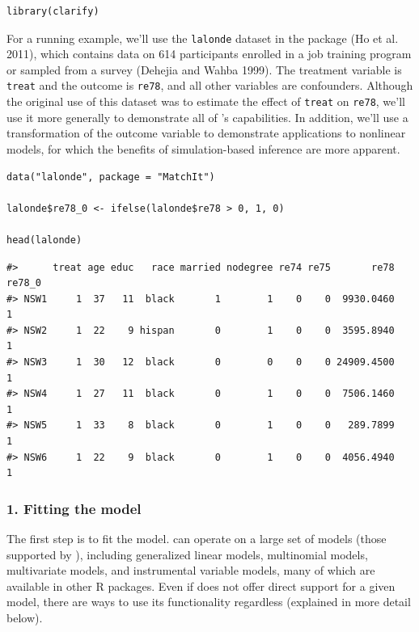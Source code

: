 \begin{verbatim}
library(clarify)
\end{verbatim}

For a running example, we'll use the \texttt{lalonde} dataset in the  package (Ho et al. 2011), which contains data on 614 participants enrolled in a job training program or sampled from a survey (Dehejia and Wahba 1999). The treatment variable is \texttt{treat} and the outcome is \texttt{re78}, and all other variables are confounders. Although the original use of this dataset was to estimate the effect of \texttt{treat} on \texttt{re78}, we'll use it more generally to demonstrate all of 's capabilities. In addition, we'll use a transformation of the outcome variable to demonstrate applications to nonlinear models, for which the benefits of simulation-based inference are more apparent.

\begin{verbatim}
data("lalonde", package = "MatchIt")

lalonde$re78_0 <- ifelse(lalonde$re78 > 0, 1, 0)

head(lalonde)
\end{verbatim}

\begin{verbatim}
#>      treat age educ   race married nodegree re74 re75       re78 re78_0
#> NSW1     1  37   11  black       1        1    0    0  9930.0460      1
#> NSW2     1  22    9 hispan       0        1    0    0  3595.8940      1
#> NSW3     1  30   12  black       0        0    0    0 24909.4500      1
#> NSW4     1  27   11  black       0        1    0    0  7506.1460      1
#> NSW5     1  33    8  black       0        1    0    0   289.7899      1
#> NSW6     1  22    9  black       0        1    0    0  4056.4940      1
\end{verbatim}

\hypertarget{fitting-the-model}{%
\subsubsection{1. Fitting the model}\label{fitting-the-model}}

The first step is to fit the model.  can operate on a large set of models (those supported by ), including generalized linear models, multinomial models, multivariate models, and instrumental variable models, many of which are available in other R packages. Even if  does not offer direct support for a given model, there are ways to use its functionality regardless (explained in more detail below).

